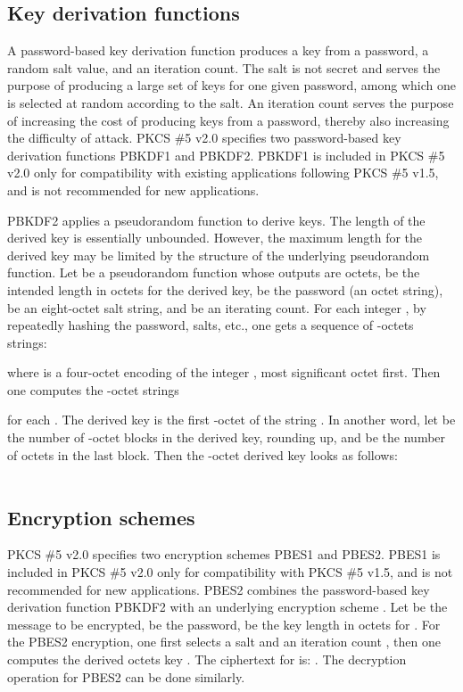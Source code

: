 \documentclass{article}
\begin{document}
\subsection{Key derivation functions}
A password-based key derivation function
produces a key from a password, a random salt value, and an iteration count.
The salt is not secret and serves the purpose of producing a 
large set of keys for one 
given password, among which one is selected at random according to the salt. 
An iteration count serves the purpose of increasing the cost 
of producing keys from a password, thereby also increasing 
the difficulty of attack. 
PKCS \#5 v2.0 specifies two password-based key derivation functions 
PBKDF1 and PBKDF2. PBKDF1 is included in PKCS \#5 v2.0  only for 
compatibility with existing applications following PKCS \#5 v1.5, 
and is not recommended for new applications.

PBKDF2 applies a pseudorandom function to derive keys. 
The length of the derived key is essentially unbounded. 
However, the maximum length for the derived key 
may be limited by the structure of the underlying pseudorandom function. 
Let   be a pseudorandom function whose outputs are
  octets,  
be the intended length in octets 
for the derived key,  be the password (an octet string), 
 be an eight-octet salt string, and  be an iterating count.
For each integer , by repeatedly hashing the password, salts, etc.,
one gets a sequence of -octets strings:

where  is a four-octet encoding of the integer , 
most significant octet first. Then one computes the  -octet strings

for each . The derived key is the first  -octet 
of the string . In another word, 
let  be the number of -octet blocks
in the derived key, rounding up, and  be 
the number of octets in the last block.
Then the -octet derived key  
looks as follows:
\begin{center}
 \begin{tabular}{|c|c|c|c|}\hline
 &  &  & \\ \hline
\end{tabular}
\end{center}

\subsection{Encryption schemes}
PKCS \#5 v2.0 specifies two encryption schemes PBES1 and PBES2.
PBES1 is included in PKCS \#5 v2.0 only 
for compatibility with PKCS \#5 v1.5, and is not recommended 
for new applications.
PBES2 combines the password-based key derivation function PBKDF2 
with an underlying encryption scheme . Let  be the 
message to be encrypted,  be the password,  be the key length
in octets for . For the PBES2 encryption, one first
selects a salt  and an iteration count , then one 
computes the derived  octets key .
The ciphertext  for  is: .
The decryption operation for PBES2 can be done similarly.
\end{document}
